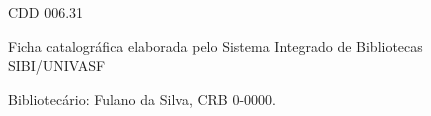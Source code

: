 \begin{fichacatalografica}
\begin{center}
{\begin{minipage}[t][7.5cm][t]{12.5cm}
\begin{minipage}[t][7.5cm][t]{11.5cm}
		\vspace{-0.5cm}
		\center
		\hspace{-1.0cm} CDD 006.31
		\end{minipage}
	\end{minipage}
	}
	\end{center}
	\vspace{-1.0cm}
	\center
	\scriptsize Ficha catalográfica elaborada pelo Sistema Integrado de Bibliotecas SIBI/UNIVASF

	\vspace{-0.5cm}
	\center \scriptsize Bibliotecário: Fulano da Silva, CRB 0-0000.
	
\end{fichacatalografica}